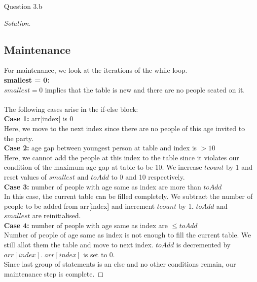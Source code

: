 \begin{solution}{Question 3.b}
\begin{proof}[Solution]
        \subsection*{Maintenance}
        For maintenance, we look at the iterations of the while loop.\\
        \textbf{smallest = 0:}\\
        $smallest = 0$ implies that the table is new and there are no people seated on it.\\\\
        The following cases arise in the if-else block:\\
        \textbf{Case 1:} arr[index] is 0\\
        Here, we move to the next index since there are no people of this age invited to the party.\\
        \textbf{Case 2:} age gap between youngest person at table and index is $>10$\\
        Here, we cannot add the people at this index to the table since it violates our condition of the maximum age gap at table to be 10. We increase $tcount$ by 1 and reset values of $smallest$ and $toAdd$ to 0 and 10 respectively.\\
        \textbf{Case 3:} number of people with age same as index are more than $toAdd$\\
        In this case, the current table can be filled completely. We subtract the number of people to be added from arr[index] and increment $tcount$ by 1. $toAdd$ and $smallest$ are reinitialised.\\
        \textbf{Case 4:} number of people with age same as index are $\leq toAdd$\\
        Number of people of age same as index is not enough to fill the current table. We still allot them the table and move to next index. $toAdd$ is decremented by $arr[index]$. $arr[index]$ is set to 0.\\
        Since last group of statements is an else and no other conditions remain, our maintenance step is complete.


\end{proof}
\end{solution}

